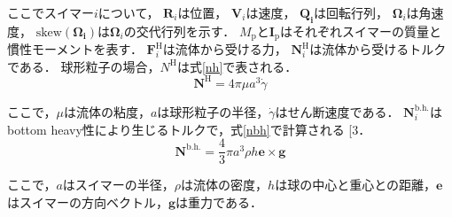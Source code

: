 \documentclass[twocolumns,10pt,a4j]{jarticle}
\makeatletter
\DeclareRobustCommand\cite{\unskip
  \@ifnextchar[{\@tempswatrue\@citex}{\@tempswafalse\@citex[]}}
\makeatother
\begin{document}
  \noindent
ここでスイマー$i$について，
$\boldsymbol{R}_i$は位置，
$\boldsymbol{V}_i$は速度，
$\boldsymbol{Q_i}$は回転行列，
$\boldsymbol{\Omega}_i$は角速度，
$\mathrm{skew} (\boldsymbol{\Omega_i})$は$\boldsymbol{\Omega}_i$の交代行列を示す．
$M_\mathrm{p}$と$\boldsymbol{I}_\mathrm{p}$はそれぞれスイマーの質量と慣性モーメントを表す．
$\boldsymbol{F}_i^\mathrm{H}$は流体から受ける力，
$\boldsymbol{N}_i^\mathrm{H}$は流体から受けるトルクである．
球形粒子の場合，$N^\mathrm{H}$は式\eqref{nh}で表される．
  \vspace{-3truemm}
  \begin{equation}
    \boldsymbol{N}^\mathrm{H} = 4 \pi \mu a^3 \dot{\gamma}
    \label{nh}
  \end{equation}
  \vspace{-6truemm}

  \noindent
ここで，$\mu$は流体の粘度，$a$は球形粒子の半径，$\dot{\gamma}$はせん断速度である．
$\boldsymbol{N}_i^\mathrm{b.h.}$はbottom heavy性により生じるトルクで，式\eqref{nbh}で計算される\cite{3}．
  \vspace{-3truemm}
  \begin{equation}
    \boldsymbol{N}^\mathrm{b.h.} = \frac{4}{3} \pi a^3 \rho h \boldsymbol{e} \times \boldsymbol{g}
    \label{nbh}
  \end{equation}
  \vspace{-4truemm}

  \noindent
ここで，$a$はスイマーの半径，$\rho$は流体の密度，$h$は球の中心と重心との距離，$\boldsymbol{e}$はスイマーの方向ベクトル，$\boldsymbol{g}$は重力である．

\end{document}
